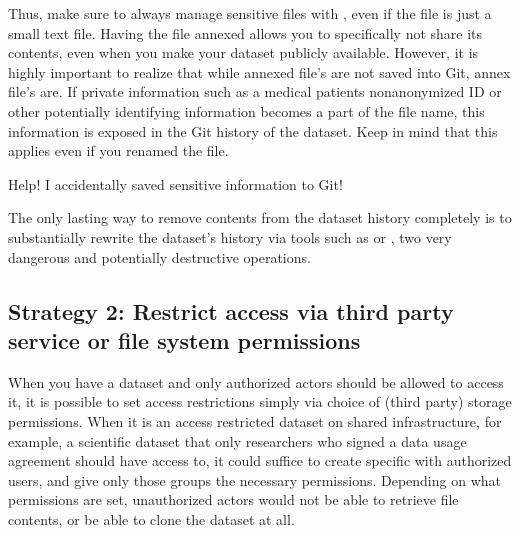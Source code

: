 \sphinxAtStartPar
Thus, make sure to always manage sensitive files with {\hyperref[\detokenize{glossary:term-git-annex}]{}}, even if the file is just a small text file.
Having the file annexed allows you to specifically not share its contents, even when you make your dataset publicly available.
However, it is highly important to realize that while annexed file’s  are not saved into Git, annex file’s  are.
If private information such as a medical patients non\sphinxhyphen{}anonymized ID or other potentially identifying information becomes a part of the file name, this information is exposed in the Git history of the dataset.
Keep in mind that this applies even if you renamed the file.

\ignorespaces \begin{findoutmore}[label={index-0}, before title={\thetcbcounter\ }, check odd page=true]{Help! I accidentally saved sensitive information to Git!}
\label{\detokenize{basics/101-139-privacy:index-0}}

\sphinxAtStartPar
The only lasting way to remove contents from the dataset history completely is to substantially rewrite the dataset’s history via tools such as  or , two very dangerous and potentially destructive operations.


\end{findoutmore}


\subsection{Strategy 2: Restrict access via third party service or file system permissions}
\label{\detokenize{basics/101-139-privacy:strategy-2-restrict-access-via-third-party-service-or-file-system-permissions}}
\sphinxAtStartPar
When you have a dataset and only authorized actors should be allowed to access it,
it is possible to set access restrictions simply via choice of (third party) storage permissions.
When it is an access restricted dataset on shared infrastructure, for example, a scientific dataset that only researchers who signed a data usage agreement should have access to, it could suffice to create specific  with authorized users, and give only those groups the necessary permissions.
Depending on what permissions are set, unauthorized actors would not be able to retrieve file contents, or be able to clone the dataset at all.

